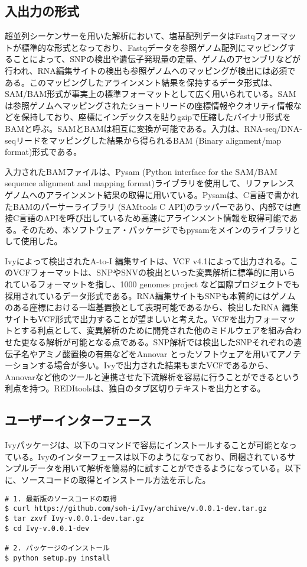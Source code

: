 \subsection{入出力の形式}
超並列シーケンサーを用いた解析において、塩基配列データはFastqフォーマットが標準的な形式となっており、Fastqデータを参照ゲノム配列にマッピングすることによって、SNPの検出や遺伝子発現量の定量、ゲノムのアセンブリなどが行われ、RNA編集サイトの検出も参照ゲノムへのマッピングが検出には必須である。このマッピングしたアラインメント結果を保持するデータ形式は、SAM/BAM形式が事実上の標準フォーマットとして広く用いられている。SAMは参照ゲノムへマッピングされたショートリードの座標情報やクオリティ情報などを保持しており、座標にインデックスを貼りgzipで圧縮したバイナリ形式をBAMと呼ぶ。SAMとBAMは相互に変換が可能である。入力は、RNA-seq/DNA-seqリードをマッピングした結果から得られるBAM (Binary alignment/map format)形式である。
\par
入力されたBAMファイルは、Pysam (Python interface for the SAM/BAM sequence alignment and mapping format)ライブラリを使用して、リファレンスゲノムへのアラインメント結果の取得に用いている。Pysamは、C言語で書かれたBAMのパーサーライブラリ (SAMtools C API)のラッパーであり、内部では直接C言語のAPIを呼び出しているため高速にアラインメント情報を取得可能である。そのため、本ソフトウェア・パッケージでもpysamをメインのライブラリとして使用した。
\par
Ivyによって検出されたA-to-I 編集サイトは、VCF v4.1によって出力される。このVCFフォーマットは、SNPやSNVの検出といった変異解析に標準的に用いられているフォーマットを指し、1000 genomes project など国際プロジェクトでも採用されているデータ形式である。RNA編集サイトもSNPも本質的にはゲノムのある座標における一塩基置換として表現可能であるから、検出したRNA 編集サイトもVCF形式で出力することが望ましいと考えた。VCFを出力フォーマットとする利点として、変異解析のために開発された他のミドルウェアを組み合わせた更なる解析が可能となる点である。SNP解析では検出したSNPそれぞれの遺伝子名やアミノ酸置換の有無などをAnnovar \citep{Wang:2010aa}とったソフトウェアを用いてアノテーションする場合が多い。Ivyで出力された結果もまたVCFであるから、Annovarなど他のツールと連携させた下流解析を容易に行うことができるという利点を持つ。REDItoolsは、独自のタブ区切りテキストを出力とする。

\subsection{ユーザーインターフェース}
Ivyパッケージは、以下のコマンドで容易にインストールすることが可能となっている。Ivyのインターフェースは以下のようになっており、同梱されているサンプルデータを用いて解析を簡易的に試すことができるようになっている。以下に、ソースコードの取得とインストール方法を示した。
{\small
\begin{verbatim}
# 1. 最新版のソースコードの取得
$ curl https://github.com/soh-i/Ivy/archive/v.0.0.1-dev.tar.gz
$ tar zxvf Ivy-v.0.0.1-dev.tar.gz
$ cd Ivy-v.0.0.1-dev

# 2. パッケージのインストール
$ python setup.py install
\end{verbatim}
}

